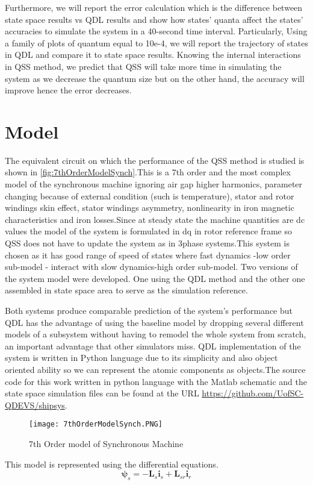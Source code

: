 \documentclass{article}
\theoremstyle{scsthe}
\begin{document}
Furthermore, we will report the error calculation which is the difference between state space results vs QDL results and show how states' quanta affect the states' accuracies to simulate the system in a 40-second time interval. Particularly, Using a family of plots of quantum equal to 10e-4, we will report the trajectory of states in QDL and compare it to state space results. Knowing the internal interactions in QSS method, we predict that QSS will take more time in simulating the system as we decrease the quantum size but on the other hand, the accuracy will improve hence the error decreases.

\section{Model}

The equivalent circuit on which the performance of the QSS method is studied is shown in \autoref{fig:7thOrderModelSynch}.This is a 7th order and the most complex model of the synchronous machine ignoring air gap higher harmonics, parameter changing because of external condition (such is temperature), stator and rotor windings skin effect, stator windings asymmetry, nonlinearity in iron magnetic characteristics and iron losses.Since at steady state the machine quantities are dc values the model of the system is formulated in dq in rotor reference frame so QSS does not have to update the system as in 3phase systems.This system is chosen as it has good range of speed of states where fast dynamics -low order sub-model - interact with slow dynamics-high order sub-model. Two versions of the system model were developed. One using the QDL method and the other one assembled in state space area to serve as the simulation reference. 

Both systems produce comparable prediction of the system's performance but QDL has the advantage of using the baseline model by dropping several different models of a subsystem without having to remodel the whole system from scratch, an important advantage that other simulators miss. QDL implementation of the system is written in Python language due to its simplicity and also object oriented ability so we can represent the atomic components as objects.The source code for this work written in python language with the Matlab schematic and the state space simulation files can be found at the URL \href{https://github.com/UofSC-QDEVS/shipsys} {https://github.com/UofSC-QDEVS/shipsys}.

\begin{figure}[H]
    \centering
    \texttt{[image: 7thOrderModelSynch.PNG]}
    \caption{7th Order model of Synchronous Machine}
    \label{fig:7thOrderModelSynch}
\end{figure}
This model is represented using the differential equations. 
\begin{equation} \label{eq:lim_dependent_branch}
{\mathbf \psi}_{s} = -{\mathbf L}_{s} {\mathbf i}_{s}+{\mathbf L}_{sr} {\mathbf i}_{r}
\end{equation}
\end{document}
